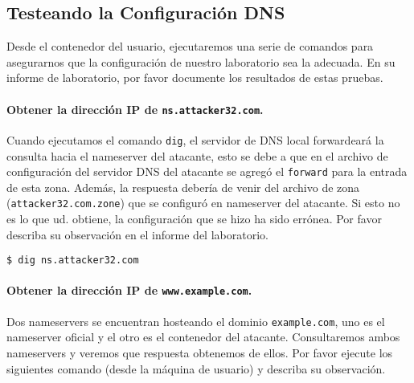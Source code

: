 

\subsection{Testeando la Configuración DNS}

Desde el contenedor del usuario, ejecutaremos una serie de comandos para asegurarnos que la configuración de nuestro laboratorio sea la adecuada. En su informe de laboratorio, por favor documente los resultados de estas pruebas.


\paragraph{Obtener la dirección IP de \texttt{ns.attacker32.com}.}
Cuando ejecutamos el comando \texttt{dig}, el servidor de DNS local forwardeará la consulta hacia el nameserver del atacante, esto se debe a que en el archivo de configuración del servidor DNS del atacante se agregó el \texttt{forward} para la entrada de esta zona. Además, la respuesta debería de venir del archivo de zona (\texttt{attacker32.com.zone}) que se configuró en nameserver del atacante.
Si esto no es lo que ud. obtiene, la configuración que se hizo ha sido errónea. Por favor describa su observación en el informe del laboratorio.

\begin{lstlisting}
$ dig ns.attacker32.com
\end{lstlisting}


\paragraph{Obtener la dirección IP de \texttt{www.example.com}.} 
Dos nameservers se encuentran hosteando el dominio \texttt{example.com}, uno es el nameserver oficial y el otro es el contenedor del atacante. Consultaremos ambos nameservers y veremos que respuesta obtenemos de ellos.
Por favor ejecute los siguientes comando (desde la máquina de usuario) y describa su observación.

